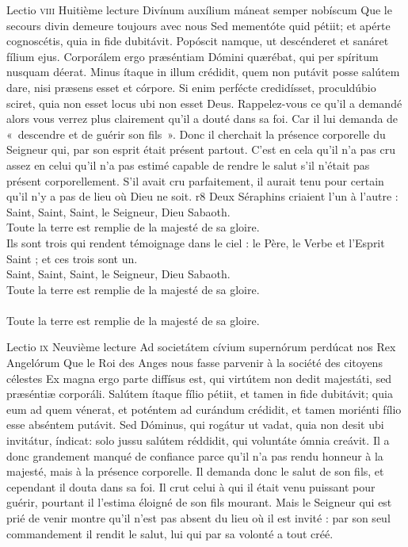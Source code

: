 \documentclass[twoside]{article}
\begin{document}
\begin{paracol}[1]{2}
\lectioresponsorium
	{Lectio \textsc{viii}}
	{Huitième lecture}
	{Divínum auxílium máneat semper nobíscum}
	{Que le secours divin demeure toujours avec nous}
	{
		Sed mementóte quid pétiit; et apérte cognoscétis, quia in fide dubitávit. Popóscit namque, ut descénderet et sanáret fílium ejus. Corporálem ergo præséntiam Dómini quærébat, qui per spíritum nusquam déerat. Minus ítaque in illum crédidit, quem non putávit posse salútem dare, nisi præsens esset et córpore. Si enim perfécte credidísset, proculdúbio sciret, quia non esset locus ubi non esset Deus.
	}
	{
		Rappelez-vous ce qu’il a demandé alors vous verrez plus clairement qu’il a douté dans sa foi. Car il lui demanda de «~descendre et de guérir son fils~». Donc il cherchait la présence corporelle du Seigneur qui, par son esprit était présent partout. C’est en cela qu’il n’a pas cru assez en celui qu’il n’a pas estimé capable de rendre le salut s’il n’était pas présent corporellement. S’il avait cru parfaitement, il aurait tenu pour certain qu’il n’y a pas de lieu où Dieu ne soit.
	}
	{r8}
	{\vfill \rr Deux Séraphins criaient l'un à l'autre :\\
	\GreSpecial{*} Saint, Saint, Saint, le Seigneur, Dieu Sabaoth.\\
	\GreSpecial{+} Toute la terre est remplie de la majesté de sa gloire.\\
	\vv Ils sont trois qui rendent témoignage dans le ciel : le Père, le Verbe et l’Esprit Saint ; et ces trois sont un.\\
	\GreSpecial{*} Saint, Saint, Saint, le Seigneur, Dieu Sabaoth.\\
	\GreSpecial{+} Toute la terre est remplie de la majesté de sa gloire.\\
	\versetGloireAuPere{}\\
	\GreSpecial{+} Toute la terre est remplie de la majesté de sa gloire.\vfill\newpage}

\newpage	
\lectioresponsorium
	{Lectio \textsc{ix}}
	{Neuvième lecture}
	{Ad societátem cívium supernórum perdúcat nos Rex Angelórum}
	{Que le Roi des Anges nous fasse parvenir à la société des citoyens célestes}
	{
		Ex magna ergo parte diffísus est, qui virtútem non dedit majestáti, sed præséntiæ corporáli. Salútem ítaque fílio pétiit, et tamen in fide dubitávit; quia eum ad quem vénerat, et poténtem ad curándum crédidit, et tamen moriénti fílio esse abséntem putávit. Sed Dóminus, qui rogátur ut vadat, quia non desit ubi invitátur, índicat: solo jussu salútem réddidit, qui voluntáte ómnia creávit.
	}
	{
		Il a donc grandement manqué de confiance parce qu’il n’a pas rendu honneur à la majesté, mais à la présence corporelle. Il demanda donc le salut de son fils, et cependant il douta dans sa foi. Il crut celui à qui il était venu puissant pour guérir, pourtant il l’estima éloigné de son fils mourant. Mais le Seigneur qui est prié de venir montre qu’il n’est pas absent du lieu où il est invité : par son seul commandement il rendit le salut, lui qui par sa volonté a tout créé.
	}
	{}
	{}



\end{paracol}
\end{document}
